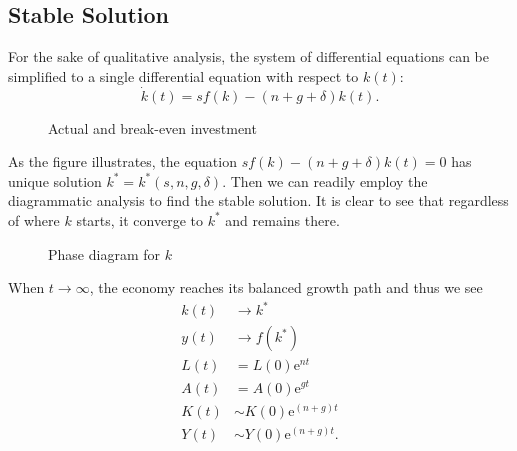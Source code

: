 \documentclass[12pt]{article} %
\newcommand{\e}{\mathrm{e}}
\begin{document}
\subsection{Stable Solution} %
For the sake of qualitative analysis, the system of differential equations can be simplified to a single differential equation with respect to $k(t)$:
\[
\dot{k}(t)=sf(k)-(n+g+\delta)k(t).
\]
\begin{figure}[H] %
	\caption{Actual and break-even investment}
	\label{fig:speciation}
\end{figure}
As the figure illustrates, the equation $sf(k)-(n+g+\delta)k(t)=0$ has unique solution $k^*=k^*(s,n,g,\delta)$. Then we can readily employ the diagrammatic analysis to find the stable solution. It is clear to see that regardless of where $k$ starts, it converge to $k^*$ and remains there.
\begin{figure}[H] %
	\caption{\small Phase diagram for $k$}
	\label{fig:speciation}
\end{figure}
When $t\rightarrow\infty$, the economy reaches its balanced growth path and thus we see
\begin{align*}
k(t) & \rightarrow k^*\\
y(t) & \rightarrow f(k^*)\\
L(t) & =L(0)\e^{nt} \\
A(t) & =A(0)\e^{gt} \\
K(t) & \sim K(0)\e^{(n+g)t}\\
Y(t) & \sim Y(0)\e^{(n+g)t}.
\end{align*}
\end{document}

